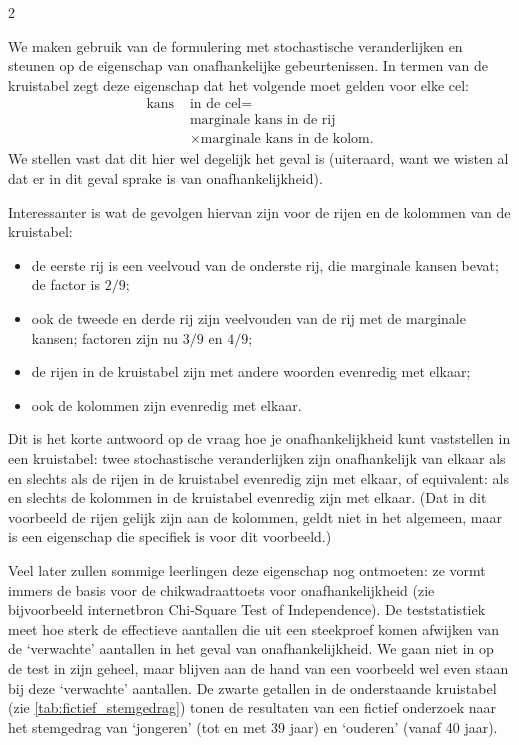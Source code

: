 \begin{multicols} {2}

We maken gebruik van de formulering met stochastische veranderlijken en steunen op de eigenschap van onafhankelijke gebeurtenissen. In termen van de kruistabel zegt deze eigenschap dat het volgende moet gelden voor elke cel:
\begin{equation*}
\begin{split}
\text{kans } & \text{in de cel} = \\
 & \text{marginale kans in de rij} \\
 & \times \text{marginale kans in de kolom.}    
\end{split}
\end{equation*}
We stellen vast dat dit hier wel degelijk het geval is (uiteraard, want we wisten al dat er in dit geval sprake is van onafhankelijkheid).

Interessanter is wat de gevolgen hiervan zijn voor de rijen en de kolommen van de kruistabel:
\begin{itemize}
    \item de eerste rij is een veelvoud van de onderste rij, die marginale kansen bevat; de factor is $2/9$;
    \item ook de tweede en derde rij zijn veelvouden van de rij met de marginale kansen; factoren zijn nu $3/9$ en $4/9$;
    \item de rijen in de kruistabel zijn met andere woorden evenredig met elkaar;
    \item ook de kolommen zijn evenredig met elkaar.
\end{itemize}
Dit is het korte antwoord op de vraag hoe je onafhankelijkheid kunt vaststellen in een kruistabel: twee stochastische veranderlijken zijn onafhankelijk van elkaar als en slechts als de rijen in de kruistabel evenredig zijn met elkaar, of equivalent: als en slechts de kolommen in de kruistabel evenredig zijn met elkaar. (Dat in dit voorbeeld de rijen gelijk zijn aan de kolommen, geldt niet in het algemeen, maar is een eigenschap die specifiek is voor dit voorbeeld.) 

Veel later zullen sommige leerlingen deze eigenschap nog ontmoeten: ze vormt immers de basis voor de chikwadraattoets voor onafhankelijkheid (zie bijvoorbeeld internetbron Chi-Square Test of Independence). De teststatistiek meet hoe sterk de effectieve aantallen die uit een steekproef komen afwijken van de ‘verwachte’ aantallen in het geval van onafhankelijkheid. We gaan niet in op de test in zijn geheel, maar blijven aan de hand van een voorbeeld wel even staan bij deze ‘verwachte’ aantallen. De zwarte getallen in de onderstaande kruistabel (zie \autoref{tab:fictief_stemgedrag}) tonen de resultaten van een fictief onderzoek naar het stemgedrag van ‘jongeren’ (tot en met 39 jaar) en ‘ouderen’ (vanaf 40 jaar).


\end{multicols}
